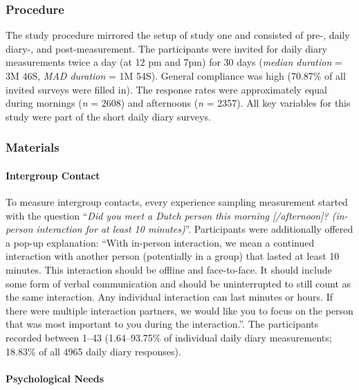 \subsubsection{Procedure}

The study procedure mirrored the setup of study one and consisted of
pre-, daily diary-, and post-measurement. The participants were invited
for daily diary measurements twice a day (at 12 pm and 7pm) for 30 days
(\textit{median duration} = 3M 46S, \textit{MAD duration} = 1M 54S).
General compliance was high (70.87\% of all invited surveys were filled
in). The response rates were approximately equal during mornings
(\textit{n} = 2608) and afternoons (\textit{n} = 2357). All key
variables for this study were part of the short daily diary surveys.

\subsubsection{Materials}

\paragraph{Intergroup Contact}

To measure intergroup contacts, every experience sampling measurement
started with the question
``\textit{Did you meet a Dutch person this morning [/afternoon]? (in-person interaction for at least 10 minutes)}''.
Participants were additionally offered a pop-up explanation: ``With
in-person interaction, we mean a continued interaction with another
person (potentially in a group) that lasted at least 10 minutes. This
interaction should be offline and face-to-face. It should include some
form of verbal communication and should be uninterrupted to still count
as the same interaction. Any individual interaction can last minutes or
hours. If there were multiple interaction partners, we would like you to
focus on the person that was most important to you during the
interaction.''. The participants recorded between 1--43 (1.64--93.75\%
of individual daily diary measurements; 18.83\% of all 4965 daily diary
responses).

\paragraph{Psychological Needs}

